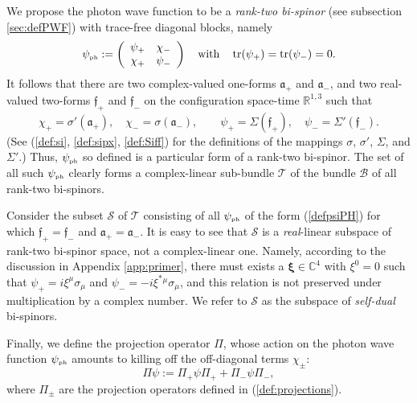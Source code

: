 \documentclass[11pt]{article}
\theoremstyle{definition}
\DeclareMathOperator{\tr}{tr}
\newcommand{\refeq}[1]{(\ref{#1})}
\numberwithin{equation}{section}
\newcommand{\fa}{\mathfrak{a}}
\newcommand{\ff}{\mathfrak{f}}
\newcommand{\bfa}{\boldsymbol{\fa}}
\newcommand{\bff}{\boldsymbol{\ff}}
\newcommand{\beq}{\begin{equation}}
\newcommand{\eeq}{\end{equation}}
\newcommand{\cB}{\mathcal{B}}
\newcommand{\cS}{{\mathcal S}}
\newcommand{\cT}{\mathcal{T}}
\newcommand{\xiV}{{\boldsymbol{\xi}}}
\newcommand{\psiPH}{{\psi_{\mbox{\rm\tiny ph}}}}
\newcommand{\Cset}{{\mathbb C}}
\newcommand{\Rset}{{\mathbb R}}
\newcommand{\si}{\sigma}
\newcommand{\Si}{\Sigma}
\begin{document}

We propose the photon wave function to be a {\em rank-two bi-spinor} (see subsection \ref{sec:defPWF}) with trace-free diagonal blocks,
namely
\beq \label{defpsiPH}
\psiPH := \left(\begin{array}{cc} \psi_+ & \chi_-\\ \chi_+ & \psi_- \end{array}\right)\quad \mbox{with}\quad
\tr(\psi_+) = \tr(\psi_-) = 0.
\eeq
 It follows that there are two complex-valued one-forms $\bfa_+$ and $\bfa_-$, and two real-valued two-forms $\bff_+$ and $ \bff_-$ on the 
configuration space-time $\Rset^{1,3}$ such 
that 
\beq \label{Fpm} \chi_+ = \si'(\bfa_+),\quad \chi_-= \si(\bfa_-),\qquad \psi_+ = \Si(\bff_+),\quad
\psi_- = \Si'(\bff_-).
\eeq
(See (\ref{def:si}, \ref{def:sipx}, \ref{def:Siff}) for the definitions of the mappings $\si$, $\si'$, $\Si$, and $\Si'$.) Thus, $\psiPH$ so defined is a particular form of a rank-two bi-spinor. 
 The set of all such $\psiPH$ clearly forms a complex-linear sub-bundle $\cT$ of the bundle $\cB$ of all rank-two bi-spinors.  

Consider the subset $\cS$ of $\cT$ consisting of all $\psiPH$ of the form \refeq{defpsiPH} for which $\bff_+ = \bff_-$ and 
$\bfa_+ = \bfa_-$.
  It is easy to see that $\cS$ is a {\em real}-linear subspace of rank-two bi-spinor space, not a complex-linear one.
  Namely, according to the discussion in Appendix \ref{app:primer}, there must exists a $\xiV \in \Cset^4$ with $\xi^0=0$ such that
$\psi_+ = i \xi^\mu \si_\mu$ and $\psi_- = -i  \xi^\ast{}^\mu \si_\mu$, and this relation is not preserved under multiplication by a 
complex number. 
 We refer to $\cS$ as the subspace of {\em self-dual} bi-spinors.  

Finally, we define the projection operator $\Pi$, whose action on the photon wave function $\psiPH$ amounts to killing off the off-diagonal 
terms $\chi_\pm$:
\beq \label{def:Pi}
\Pi \psi 
:= \Pi_{+}^{} \psi \Pi_{+}^{} + \Pi_{-}^{} \psi \Pi_{-}^{},
\eeq
where $\Pi_\pm$ are the projection operators defined in \refeq{def:projections}.


\end{document}
